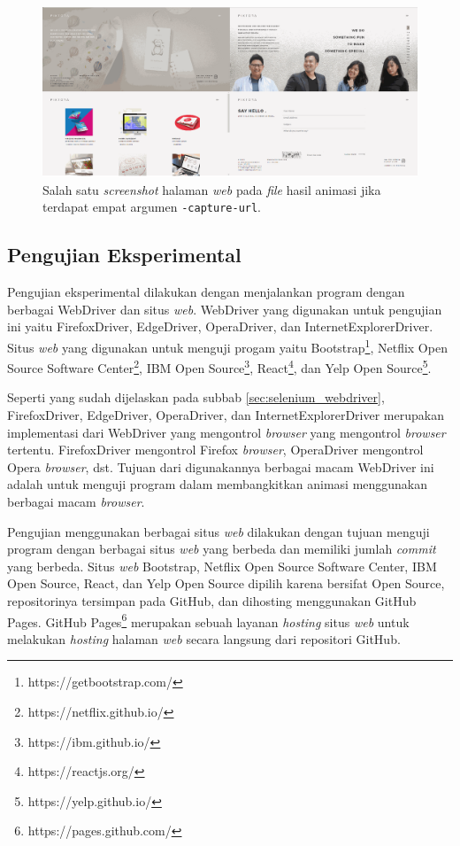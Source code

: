 \begin{figure}[H]
	\centering
		\includegraphics[scale=0.3]{Gambar/capture4.png}
	\caption{Salah satu \textit{screenshot} halaman \textit{web} pada \textit{file} hasil animasi jika terdapat empat argumen \texttt{-capture-url}.}
	\label{fig:capture4}
\end{figure}




\subsection{Pengujian Eksperimental}
\label{sec:pengujian_eksperimental} 
Pengujian eksperimental dilakukan dengan menjalankan program dengan berbagai WebDriver dan situs \textit{web}. 
WebDriver yang digunakan untuk pengujian ini yaitu FirefoxDriver, EdgeDriver, OperaDriver, dan InternetExplorerDriver. Situs \textit{web} yang digunakan untuk menguji progam yaitu Bootstrap\footnote{https://getbootstrap.com/}, Netflix Open Source Software Center\footnote{https://netflix.github.io/}, IBM Open Source\footnote{https://ibm.github.io/}, React\footnote{https://reactjs.org/}, dan Yelp Open Source\footnote{https://yelp.github.io/}. 

Seperti yang sudah dijelaskan pada subbab \ref{sec:selenium_webdriver}, FirefoxDriver, EdgeDriver, OperaDriver, dan InternetExplorerDriver merupakan implementasi dari WebDriver yang mengontrol \textit{browser} yang mengontrol \textit{browser} tertentu. FirefoxDriver mengontrol Firefox \textit{browser}, OperaDriver mengontrol Opera \textit{browser}, dst. Tujuan dari digunakannya berbagai macam WebDriver ini adalah untuk menguji program dalam membangkitkan animasi menggunakan berbagai macam \textit{browser}.

Pengujian menggunakan berbagai situs \textit{web} dilakukan dengan tujuan menguji program dengan berbagai situs \textit{web} yang berbeda dan memiliki jumlah \textit{commit} yang berbeda. Situs \textit{web} Bootstrap, Netflix Open Source Software Center, IBM Open Source, React, dan Yelp Open Source  dipilih karena bersifat Open Source, repositorinya tersimpan pada GitHub, dan dihosting menggunakan GitHub Pages. GitHub Pages\footnote{https://pages.github.com/} merupakan sebuah layanan \textit{hosting} situs \textit{web} untuk melakukan \textit{hosting} halaman \textit{web} secara langsung dari repositori GitHub.     

